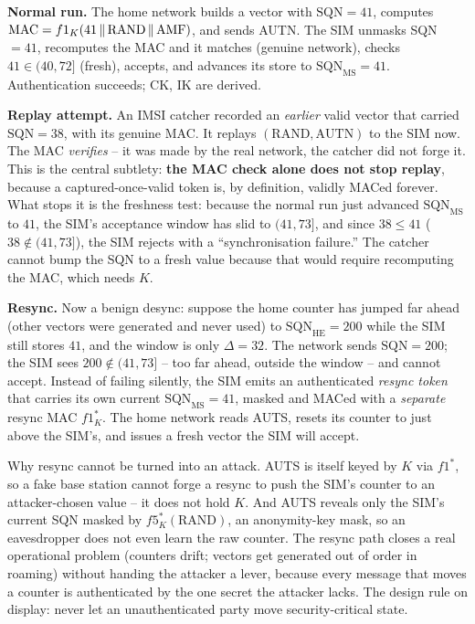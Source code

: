 \textbf{Normal run.} The home network builds a vector with $\text{SQN}=41$, computes $\text{MAC}=f1_K(41 \allowbreak \,\|\, \text{RAND} \allowbreak \,\|\, \text{AMF})$, and sends AUTN. The SIM unmasks SQN $=41$, recomputes the MAC and it matches (genuine network), checks $41 \in (40,72]$ (fresh), accepts, and advances its store to $\text{SQN}_{\text{MS}}=41$. Authentication succeeds; CK, IK are derived.

\textbf{Replay attempt.} An IMSI catcher recorded an \emph{earlier} valid vector that carried $\text{SQN}=38$, with its genuine MAC. It replays $(\text{RAND}, \text{AUTN})$ to the SIM now. The MAC \emph{verifies} -- it was made by the real network, the catcher did not forge it. This is the central subtlety: \textbf{the MAC check alone does not stop replay}, because a captured-once-valid token is, by definition, validly MACed forever. What stops it is the freshness test: because the normal run just advanced $\text{SQN}_{\text{MS}}$ to $41$, the SIM's acceptance window has slid to $(41,73]$, and since $38 \le 41$ ($38 \notin (41,73]$), the SIM rejects with a ``synchronisation failure.'' The catcher cannot bump the SQN to a fresh value because that would require recomputing the MAC, which needs $K$.

\textbf{Resync.} Now a benign desync: suppose the home counter has jumped far ahead (other vectors were generated and never used) to $\text{SQN}_{\text{HE}}=200$ while the SIM still stores $41$, and the window is only $\Delta=32$. The network sends $\text{SQN}=200$; the SIM sees $200 \notin (41,73]$ -- too far ahead, outside the window -- and cannot accept. Instead of failing silently, the SIM emits an authenticated \emph{resync token}  that carries its own current $\text{SQN}_{\text{MS}}=41$, masked and MACed with a \emph{separate} resync MAC $f1^\ast_K$. The home network reads AUTS, resets its counter to just above the SIM's, and issues a fresh vector the SIM will accept.

\begin{whybox}
Why resync cannot be turned into an attack. AUTS is itself keyed by $K$ via $f1^\ast$, so a fake base station cannot forge a resync to push the SIM's counter to an attacker-chosen value -- it does not hold $K$. And AUTS reveals only the SIM's current SQN masked by $f5^\ast_K(\text{RAND})$, an anonymity-key mask, so an eavesdropper does not even learn the raw counter. The resync path closes a real operational problem (counters drift; vectors get generated out of order in roaming) without handing the attacker a lever, because every message that moves a counter is authenticated by the one secret the attacker lacks. The design rule on display: never let an unauthenticated party move security-critical state.
\end{whybox}

